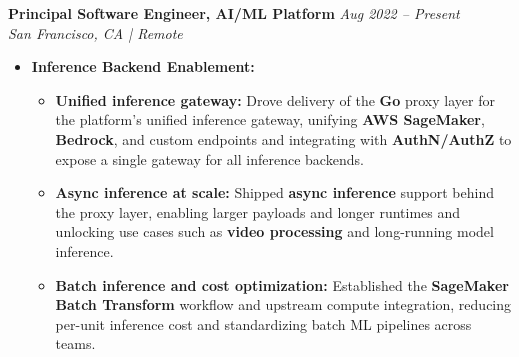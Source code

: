 \vspace{0.15em}
\noindent\textbf{\sffamily Principal Software Engineer, AI/ML Platform} \hfill \textit{Aug 2022 -- Present} \\
 \hfill \textit{San Francisco, CA | Remote}
\vspace{0.05em}

\begin{itemize}[leftmargin=1.25em, topsep=1pt, partopsep=1.5pt]
\setlength\itemsep{0.22em}

\item \textbf{Inference Backend Enablement:}
    \begin{itemize}[leftmargin=2.25em]
        \setlength\itemsep{0.2em}
        \item \textbf{Unified inference gateway:} Drove delivery of the \textbf{Go} proxy layer for the platform's unified inference gateway, unifying \textbf{AWS SageMaker}, \textbf{Bedrock}, and custom endpoints and integrating with \textbf{AuthN/AuthZ} to expose a single gateway for all inference backends.
        \item \textbf{Async inference at scale:} Shipped \textbf{async inference} support behind the proxy layer, enabling larger payloads and longer runtimes and unlocking use cases such as \textbf{video processing} and long-running model inference.
        \item \textbf{Batch inference and cost optimization:} Established the \textbf{SageMaker Batch Transform} workflow and upstream compute integration, reducing per-unit inference cost and standardizing batch ML pipelines across teams.
    \end{itemize}
\vspace{0.4em}


\end{itemize}
